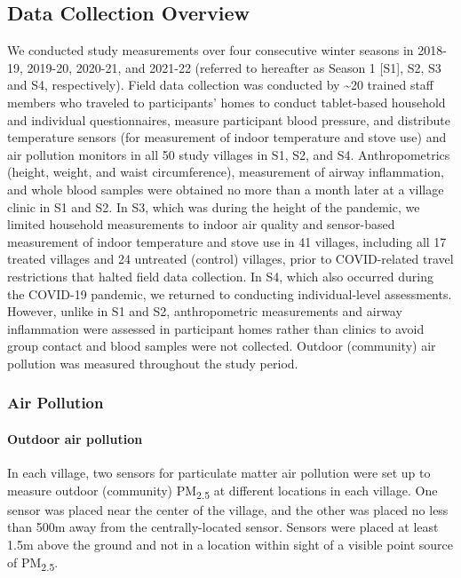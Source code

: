 \documentclass[
  letterpaper,
  DIV=11,
  numbers=noendperiod]{scrartcl}
\let\oldparagraph\paragraph
\renewcommand{\paragraph}[1]{\oldparagraph{#1}\mbox{}}
\begin{document}
\hypertarget{data-collection-overview}{%
\subsection{Data Collection Overview}\label{data-collection-overview}}

We conducted study measurements over four consecutive winter seasons in
2018-19, 2019-20, 2020-21, and 2021-22 (referred to hereafter as Season
1 {[}S1{]}, S2, S3 and S4, respectively). Field data collection was
conducted by \textasciitilde20 trained staff members who traveled to
participants' homes to conduct tablet-based household and individual
questionnaires, measure participant blood pressure, and distribute
temperature sensors (for measurement of indoor temperature and stove
use) and air pollution monitors in all 50 study villages in S1, S2, and
S4. Anthropometrics (height, weight, and waist circumference),
measurement of airway inflammation, and whole blood samples were
obtained no more than a month later at a village clinic in S1 and S2. In
S3, which was during the height of the pandemic, we limited household
measurements to indoor air quality and sensor-based measurement of
indoor temperature and stove use in 41 villages, including all 17
treated villages and 24 untreated (control) villages, prior to
COVID-related travel restrictions that halted field data collection. In
S4, which also occurred during the COVID-19 pandemic, we returned to
conducting individual-level assessments. However, unlike in S1 and S2,
anthropometric measurements and airway inflammation were assessed in
participant homes rather than clinics to avoid group contact and blood
samples were not collected. Outdoor (community) air pollution was
measured throughout the study period.

\hypertarget{air-pollution}{%
\subsubsection{Air Pollution}\label{air-pollution}}

\hypertarget{outdoor-air-pollution}{%
\paragraph{Outdoor air pollution}\label{outdoor-air-pollution}}

In each village, two sensors for particulate matter air pollution were
set up to measure outdoor (community) PM\textsubscript{2.5} at different
locations in each village. One sensor was placed near the center of the
village, and the other was placed no less than 500m away from the
centrally-located sensor. Sensors were placed at least 1.5m above the
ground and not in a location within sight of a visible point source of
PM\textsubscript{2.5}.
\end{document}
